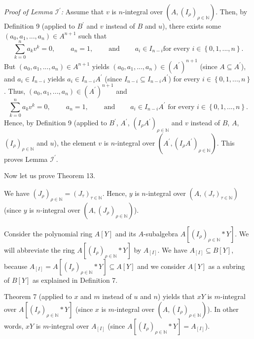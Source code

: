 \documentclass[12pt,final,notitlepage,onecolumn]{article}%
\begin{document}
\textit{Proof of Lemma }$\mathcal{I}^{\prime}$\textit{:} Assume that $v$ is
$n$-integral over $\left(  A,\left(  I_{\rho}\right)  _{\rho\in\mathbb{N}%
}\right)  $. Then, by Definition 9 (applied to $B^{\prime}$ and $v$ instead of
$B$ and $u$), there exists some $\left(  a_{0},a_{1},...,a_{n}\right)  \in
A^{n+1}$ such that%
\[
\sum\limits_{k=0}^{n}a_{k}v^{k}=0,\ \ \ \ \ \ \ \ \ \ a_{n}%
=1,\ \ \ \ \ \ \ \ \ \ \text{and}\ \ \ \ \ \ \ \ \ \ a_{i}\in I_{n-i}\text{
for every }i\in\left\{  0,1,...,n\right\}  .
\]
But $\left(  a_{0},a_{1},...,a_{n}\right)  \in A^{n+1}$ yields $\left(
a_{0},a_{1},...,a_{n}\right)  \in\left(  A^{\prime}\right)  ^{n+1}$ (since
$A\subseteq A^{\prime}$), and $a_{i}\in I_{n-i}$ yields $a_{i}\in
I_{n-i}A^{\prime}$ (since $I_{n-i}\subseteq I_{n-i}A^{\prime}$) for every
$i\in\left\{  0,1,...,n\right\}  $. Thus, $\left(  a_{0},a_{1},...,a_{n}%
\right)  \in\left(  A^{\prime}\right)  ^{n+1}$ and%
\[
\sum\limits_{k=0}^{n}a_{k}v^{k}=0,\ \ \ \ \ \ \ \ \ \ a_{n}%
=1,\ \ \ \ \ \ \ \ \ \ \text{and}\ \ \ \ \ \ \ \ \ \ a_{i}\in I_{n-i}%
A^{\prime}\text{ for every }i\in\left\{  0,1,...,n\right\}  .
\]
Hence, by Definition 9 (applied to $B^{\prime}$, $A^{\prime}$, $\left(
I_{\rho}A^{\prime}\right)  _{\rho\in\mathbb{N}}$ and $v$ instead of $B$, $A$,
$\left(  I_{\rho}\right)  _{\rho\in\mathbb{N}}$ and $u$), the element $v$ is
$n$-integral over $\left(  A^{\prime},\left(  I_{\rho}A^{\prime}\right)
_{\rho\in\mathbb{N}}\right)  $. This proves Lemma $\mathcal{I}^{\prime}$.

Now let us prove Theorem 13.

We have $\left(  J_{\rho}\right)  _{\rho\in\mathbb{N}}=\left(  J_{\tau
}\right)  _{\tau\in\mathbb{N}}$. Hence, $y$ is $n$-integral over $\left(
A,\left(  J_{\tau}\right)  _{\tau\in\mathbb{N}}\right)  $ (since $y$ is
$n$-integral over $\left(  A,\left(  J_{\rho}\right)  _{\rho\in\mathbb{N}%
}\right)  $).

Consider the polynomial ring $A\left[  Y\right]  $ and its $A$-subalgebra
$A\left[  \left(  I_{\rho}\right)  _{\rho\in\mathbb{N}}\ast Y\right]  $. We
will abbreviate the ring $A\left[  \left(  I_{\rho}\right)  _{\rho
\in\mathbb{N}}\ast Y\right]  $ by $A_{\left[  I\right]  }$. We have
$A_{\left[  I\right]  }\subseteq B\left[  Y\right]  $, because $A_{\left[
I\right]  }=A\left[  \left(  I_{\rho}\right)  _{\rho\in\mathbb{N}}\ast
Y\right]  \subseteq A\left[  Y\right]  $ and we consider $A\left[  Y\right]  $
as a subring of $B\left[  Y\right]  $ as explained in Definition 7.

Theorem 7 (applied to $x$ and $m$ instead of $u$ and $n$) yields that $xY$ is
$m$-integral over $A\left[  \left(  I_{\rho}\right)  _{\rho\in\mathbb{N}}\ast
Y\right]  $ (since $x$ is $m$-integral over $\left(  A,\left(  I_{\rho
}\right)  _{\rho\in\mathbb{N}}\right)  $). In other words, $xY$ is
$m$-integral over $A_{\left[  I\right]  }$ (since $A\left[  \left(  I_{\rho
}\right)  _{\rho\in\mathbb{N}}\ast Y\right]  =A_{\left[  I\right]  }$).
\end{document}
